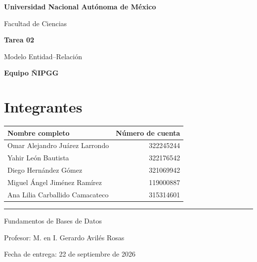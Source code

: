 \documentclass[11pt,letterpaper]{article}
\begin{document}
\thispagestyle{empty}

\begin{center}
  {\Large\bfseries\color{unamblue} Universidad Nacional Autónoma de México\par}
  \vspace{0.2cm}
  {\large Facultad de Ciencias\par}
  \vspace{0.8cm}
  {\LARGE\bfseries Tarea 02\par}
  \vspace{0.15cm}
  {\Large Modelo Entidad--Relación\par}
  \vspace{0.35cm}
  {\large\bfseries Equipo ÑIPGG\par}
\end{center}

\vspace{0.7cm}

\section*{Integrantes}

\renewcommand{\arraystretch}{1.25}
\noindent\begin{tabularx}{\textwidth}{@{}Xr@{}}
  \toprule
  \textbf{Nombre completo} & \textbf{Número de cuenta} \\
  \midrule
  Omar Alejandro Juárez Larrondo & 322245244 \\
  Yahir León Bautista & 322176542 \\
  Diego Hernández Gómez & 321069942 \\
  Miguel Ángel Jiménez Ramírez & 119000887 \\
  Ana Lilia Carballido Camacateco & 315314601 \\
  \bottomrule
\end{tabularx}

\vfill
\begin{center}
  \color{unamgold}\rule{0.72\textwidth}{1pt}

  \vspace{0.25cm}
  {\small Fundamentos de Bases de Datos\par}
  {\small Profesor: M. en I. Gerardo Avilés Rosas\par}
  {\small Fecha de entrega: 22 de septiembre de 2026\par}
\end{center}
\end{document}
